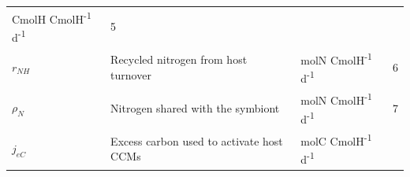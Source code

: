 \documentclass[]{elsarticle} %
\begin{document}
\begin{longtable}[c]{@{}llll@{}}
\begin{minipage}[t]{0.26\columnwidth}\raggedright\strut
CmolH CmolH\textsuperscript{-1} d\textsuperscript{-1}
\strut\end{minipage} &
\begin{minipage}[t]{0.10\columnwidth}\raggedright\strut
5
\strut\end{minipage}\tabularnewline
\begin{minipage}[t]{0.12\columnwidth}\raggedright\strut
\(r_{NH}\)
\strut\end{minipage} &
\begin{minipage}[t]{0.48\columnwidth}\raggedright\strut
Recycled nitrogen from host turnover
\strut\end{minipage} &
\begin{minipage}[t]{0.26\columnwidth}\raggedright\strut
molN CmolH\textsuperscript{-1} d\textsuperscript{-1}
\strut\end{minipage} &
\begin{minipage}[t]{0.10\columnwidth}\raggedright\strut
6
\strut\end{minipage}\tabularnewline
\begin{minipage}[t]{0.12\columnwidth}\raggedright\strut
\(\rho_N\)
\strut\end{minipage} &
\begin{minipage}[t]{0.48\columnwidth}\raggedright\strut
Nitrogen shared with the symbiont
\strut\end{minipage} &
\begin{minipage}[t]{0.26\columnwidth}\raggedright\strut
molN CmolH\textsuperscript{-1} d\textsuperscript{-1}
\strut\end{minipage} &
\begin{minipage}[t]{0.10\columnwidth}\raggedright\strut
7
\strut\end{minipage}\tabularnewline
\begin{minipage}[t]{0.12\columnwidth}\raggedright\strut
\(j_{eC}\)
\strut\end{minipage} &
\begin{minipage}[t]{0.48\columnwidth}\raggedright\strut
Excess carbon used to activate host CCMs
\strut\end{minipage} &
\begin{minipage}[t]{0.26\columnwidth}\raggedright\strut
molC CmolH\textsuperscript{-1} d\textsuperscript{-1}
\strut\end{minipage} &
\begin{minipage}[t]{0.10\columnwidth}\raggedright\strut
\strut\end{minipage}\tabularnewline

\end{longtable}
\end{document}
